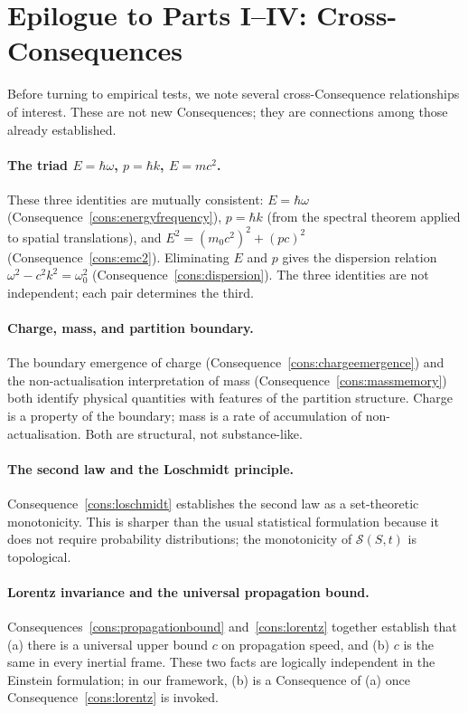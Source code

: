 \documentclass[11pt,twocolumn,a4paper]{article}
\theoremstyle{axiomstyle}
\theoremstyle{conseqstyle}
\theoremstyle{definition}
\theoremstyle{remark}
\newcommand{\Sspace}{\mathcal{S}}
\begin{document}
\section*{Epilogue to Parts I--IV: Cross-Consequences}

Before turning to empirical tests, we note several cross-Consequence relationships of interest. These are not new Consequences; they are connections among those already established.

\paragraph{The triad $E=\hbar\omega$, $p=\hbar k$, $E=mc^{2}$.} These three identities are mutually consistent: $E=\hbar\omega$ (Consequence~\ref{cons:energyfrequency}), $p=\hbar k$ (from the spectral theorem applied to spatial translations), and $E^{2}=(m_{0}c^{2})^{2}+(pc)^{2}$ (Consequence~\ref{cons:emc2}). Eliminating $E$ and $p$ gives the dispersion relation $\omega^{2}-c^{2}k^{2}=\omega_{0}^{2}$ (Consequence~\ref{cons:dispersion}). The three identities are not independent; each pair determines the third.

\paragraph{Charge, mass, and partition boundary.} The boundary emergence of charge (Consequence~\ref{cons:chargeemergence}) and the non-actualisation interpretation of mass (Consequence~\ref{cons:massmemory}) both identify physical quantities with features of the partition structure. Charge is a property of the boundary; mass is a rate of accumulation of non-actualisation. Both are structural, not substance-like.

\paragraph{The second law and the Loschmidt principle.} Consequence~\ref{cons:loschmidt} establishes the second law as a set-theoretic monotonicity. This is sharper than the usual statistical formulation because it does not require probability distributions; the monotonicity of $\Sspace(S,t)$ is topological.

\paragraph{Lorentz invariance and the universal propagation bound.} Consequences~\ref{cons:propagationbound} and~\ref{cons:lorentz} together establish that (a) there is a universal upper bound $c$ on propagation speed, and (b) $c$ is the same in every inertial frame. These two facts are logically independent in the Einstein formulation; in our framework, (b) is a Consequence of (a) once Consequence~\ref{cons:lorentz} is invoked.
\end{document}
